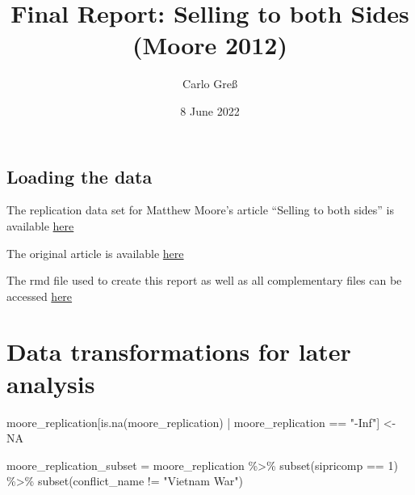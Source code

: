 \documentclass[
]{article}
\title{Final Report: Selling to both Sides (Moore 2012)}
\author{Carlo Greß}
\date{8 June 2022}
\newenvironment{Shaded}{\begin{snugshade}}{\end{snugshade}}
\newcommand{\ConstantTok}[1]{\textcolor[rgb]{0.00,0.00,0.00}{#1}}
\newcommand{\DecValTok}[1]{\textcolor[rgb]{0.00,0.00,0.81}{#1}}
\newcommand{\FunctionTok}[1]{\textcolor[rgb]{0.00,0.00,0.00}{#1}}
\newcommand{\NormalTok}[1]{#1}
\newcommand{\OtherTok}[1]{\textcolor[rgb]{0.56,0.35,0.01}{#1}}
\newcommand{\SpecialCharTok}[1]{\textcolor[rgb]{0.00,0.00,0.00}{#1}}
\newcommand{\StringTok}[1]{\textcolor[rgb]{0.31,0.60,0.02}{#1}}
\begin{document}
\maketitle

\hypertarget{loading-the-data}{%
\subsection{Loading the data}\label{loading-the-data}}

The replication data set for Matthew Moore's article ``Selling to both
sides'' is available
\href{https://dataverse.harvard.edu/dataset.xhtml?persistentId=doi:10.7910/DVN/8PKAI0}{here}

The original article is available
\href{https://www.tandfonline.com/doi/pdf/10.1080/03050629.2012.676511?casa_token=JNzRApl8w24AAAAA:Sth2YQPRDCYC-RSAX90DJVyzofnIauIWa9eU7561mATdM_fm2NdfEJHqKdOOavQeNwlJNLF-mvJExw}{here}

The rmd file used to create this report as well as all complementary
files can be accessed
\href{https://github.com/carlo-gress/causal_selling_to_both_sides}{here}

\hypertarget{data-transformations-for-later-analysis}{%
\section{Data transformations for later
analysis}\label{data-transformations-for-later-analysis}}

\begin{Shaded}
\end{Shaded}

\begin{Shaded}
\begin{Highlighting}[]
\NormalTok{moore\_replication[}\FunctionTok{is.na}\NormalTok{(moore\_replication) }\SpecialCharTok{|}\NormalTok{ moore\_replication }\SpecialCharTok{==} \StringTok{"{-}Inf"}\NormalTok{] }\OtherTok{\textless{}{-}} \ConstantTok{NA}
\end{Highlighting}
\end{Shaded}

\begin{Shaded}
\begin{Highlighting}[]
\NormalTok{moore\_replication\_subset }\OtherTok{=}\NormalTok{ moore\_replication }\SpecialCharTok{\%\textgreater{}\%} 
  \FunctionTok{subset}\NormalTok{(sipricomp }\SpecialCharTok{==} \DecValTok{1}\NormalTok{) }\SpecialCharTok{\%\textgreater{}\%} 
  \FunctionTok{subset}\NormalTok{(conflict\_name }\SpecialCharTok{!=} \StringTok{"Vietnam War"}\NormalTok{)}
\end{Highlighting}
\end{Shaded}
\end{document}
